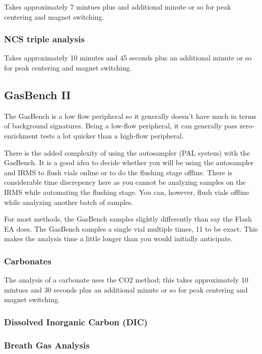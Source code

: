 \documentclass[12pt]{../SOP3}\usepackage[]{graphicx}\usepackage[]{color}
\begin{document}
\NP Takes approximately 7 mintues plus and additional minute or so for peak centering and magnet switching.

\subsubsection{NCS triple analysis} 

\NP Takes approximately 10 minutes and 45 seconds plus an additional minute or so for peak centering and magnet switching.

\subsection{GasBench II}

\NP The GasBench is a low flow peripheral so it generally doesn't have much in terms of background signatures. Being a low-flow peripheral, it can generally pass zero-enrichment tests a lot quicker than a high-flow peripheral.

\NP There is the added complexity of using the autosampler (PAL system) with the GasBench. It is a good idea to decide whether you will be using the autosampler and IRMS to flush vials online or to do the flushing stage offline. There is considerable time discrepency here as you cannot be analyzing samples on the IRMS while automating the flushing stage. You can, however, flush vials offline while analyzing another batch of samples.

\NP For most methods, the GasBench samples slightly differently than say the Flash EA does. The GasBench samples a single vial multiple times, 11 to be exact. This makes the analysis time a little longer than you would initially anticipate.

\subsubsection{Carbonates}

\NP The analysis of a carbonate uses the CO2 method; this takes approximately 10 mintues and 30 seconds plus an additional minute or so for peak centering and magnet switching.

\subsubsection{Dissolved Inorganic Carbon (DIC)}

\subsubsection{Breath Gas Analysis}
\end{document}
